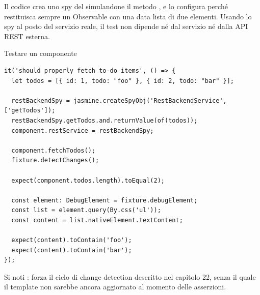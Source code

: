 Il codice crea uno spy del  simulandone il metodo
, e lo configura perché restituisca sempre un Observable con
una data lista di due elementi. Usando lo spy al posto del servizio reale, il
test non dipende né dal servizio né dalla API REST esterna.

\begin{esempio}{Testare un componente}
\begin{affianco}[0.6][c]
\codicepiccolo
\begin{lstlisting}[style=ts, name=todo-page.component.spec.ts]
it('should properly fetch to-do items', () => {
  let todos = [{ id: 1, todo: "foo" }, { id: 2, todo: "bar" }];

  restBackendSpy = jasmine.createSpyObj('RestBackendService', ['getTodos']);
  restBackendSpy.getTodos.and.returnValue(of(todos));
  component.restService = restBackendSpy;

  component.fetchTodos();
  fixture.detectChanges();

  expect(component.todos.length).toEqual(2);

  const element: DebugElement = fixture.debugElement;
  const list = element.query(By.css('ul'));
  const content = list.nativeElement.textContent;

  expect(content).toContain('foo');
  expect(content).toContain('bar');
});
\end{lstlisting}
\risultato
\begin{immagine}
\end{immagine}
\end{affianco}

Si noti : forza il ciclo di change detection
descritto nel capitolo 22, senza il quale il template non sarebbe ancora
aggiornato al momento delle asserzioni.
\end{esempio}

